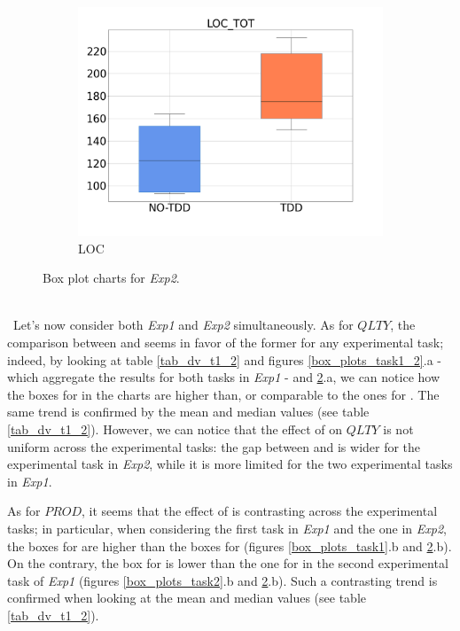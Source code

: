 \begin{figure}[htbp]
\begin{subfigure}{0.33\textwidth}
        \includegraphics[width=\linewidth]{figures/box_plots/task3/LOC.png}
        \caption{LOC}
        \label{bp_task3_loc}
    \end{subfigure}
    \caption{Box plot charts for \textit{Exp2}.}
    \label{box_plots_task3}
\end{figure}

\ \\ \
Let's now consider both \textit{Exp1} and \textit{Exp2} simultaneously. As for $QLTY$, the comparison between \tdd and \notdd seems in favor of the former for any experimental task; indeed, by looking at table \ref{tab_dv_t1_2}  and figures \ref{box_plots_task1_2}.a - which aggregate the results for both tasks in \textit{Exp1} - and \ref{box_plots_task3}.a, we can notice how the boxes for \tdd in the charts are higher than, or comparable to the ones for \notdd. The same trend is confirmed by the mean and median values (see table \ref{tab_dv_t1_2}). However, we can notice that the effect of \tdd on $QLTY$ is not uniform across the experimental tasks: the gap between \tdd and \notdd is wider for the experimental task in \textit{Exp2}, while it is more limited for the two
experimental tasks in \textit{Exp1}.

As for $PROD$, it seems that the effect of \tdd is contrasting across the experimental tasks; in particular, when considering the first task in \textit{Exp1} and the one in \textit{Exp2}, the boxes for \tdd are  higher than the
boxes for \notdd (figures \ref{box_plots_task1}.b and \ref{box_plots_task3}.b). On the contrary, the box for \tdd is lower than the one for \notdd in the second experimental task of \textit{Exp1} (figures \ref{box_plots_task2}.b and \ref{box_plots_task3}.b). Such a contrasting trend is confirmed when looking at the mean and median values (see table \ref{tab_dv_t1_2}).

